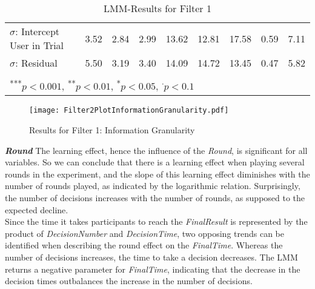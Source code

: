 {\begin{landscape}
\begin{table}
\begin{center}
\begin{tabular}{l D{.}{.}{5.5} @{}D{.}{.}{5.5} @{}D{.}{.}{5.5} @{}D{.}{.}{5.5} @{}D{.}{.}{5.5} @{}D{.}{.}{5.5} @{}D{.}{.}{4.5}@{}D{.}{.}{4.5} @{}}
$\sigma$: Intercept User in Trial &   3.52     &     2.84    &      2.99 &13.62&  12.81     &    17.58   &   0.59  & 7.11 \\
$\sigma$: Residual         &     5.50   &    3.19   &    3.40    &       14.09&   14.72    &    13.45   & 0.47& 5.82\\
\bottomrule
\vspace{-3mm}\\
\end{tabular}
\caption{LMM-Results for Filter 1}
\label{table:coefficients}
\end{center}
\end{table}
\end{landscape}} 
\begin{figure}[H] %
\begin{center}
\texttt{[image: Filter2PlotInformationGranularity.pdf]}    
  \caption[Results for Filter 1: Information Granularity]{Results for Filter 1: Information Granularity\footnotemark}
    \label{fig:Results for Filter 1: Information Granularity} 
\end{center}
\end{figure}

\textbf{\textit{Round} }The learning effect, hence the influence of the \textit{Round}, is significant for all variables. So we can conclude that there is a learning effect when playing several rounds in the experiment, and the slope of this learning effect diminishes with the number of rounds played, as indicated by the logarithmic relation. Surprisingly, the number of decisions increases with the number of rounds, as supposed to the expected decline. \\
Since the time it takes participants to reach the \textit{FinalResult} is represented by the product of \textit{DecisionNumber} and \textit{DecisionTime}, two opposing trends can be identified when describing the round effect on the \textit{FinalTime}. Whereas the number of decisions increases, the time to take a decision decreases. The \ac{LMM} returns a negative parameter for \textit{FinalTime},  indicating that the decrease in the decision times outbalances the increase in the number of decisions.  

